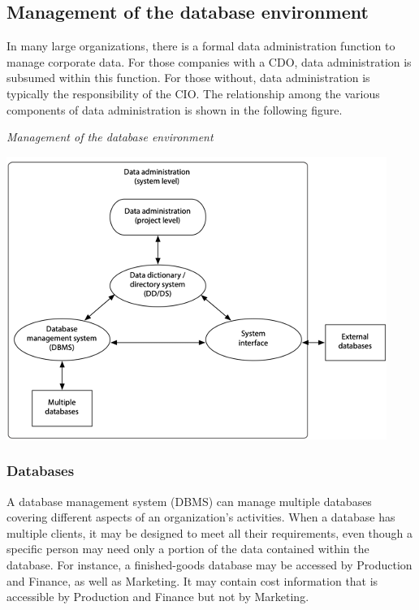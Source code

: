 \documentclass[
]{article}
\begin{document}
\hypertarget{management-of-the-database-environment}{%
\subsection*{Management of the database environment}\label{management-of-the-database-environment}}

In many large organizations, there is a formal data administration
function to manage corporate data. For those companies with a CDO, data
administration is subsumed within this function. For those without, data
administration is typically the responsibility of the CIO. The
relationship among the various components of data administration is
shown in the following figure.

\emph{Management of the database environment}

\includegraphics{Figures/Chapter 24/database-environment.png}

\hypertarget{databases}{%
\subsubsection*{Databases}\label{databases}}

A database management system (DBMS) can manage multiple databases
covering different aspects of an organization's activities. When a
database has multiple clients, it may be designed to meet all their
requirements, even though a specific person may need only a portion of
the data contained within the database. For instance, a finished-goods
database may be accessed by Production and Finance, as well as
Marketing. It may contain cost information that is accessible by
Production and Finance but not by Marketing.
\end{document}
